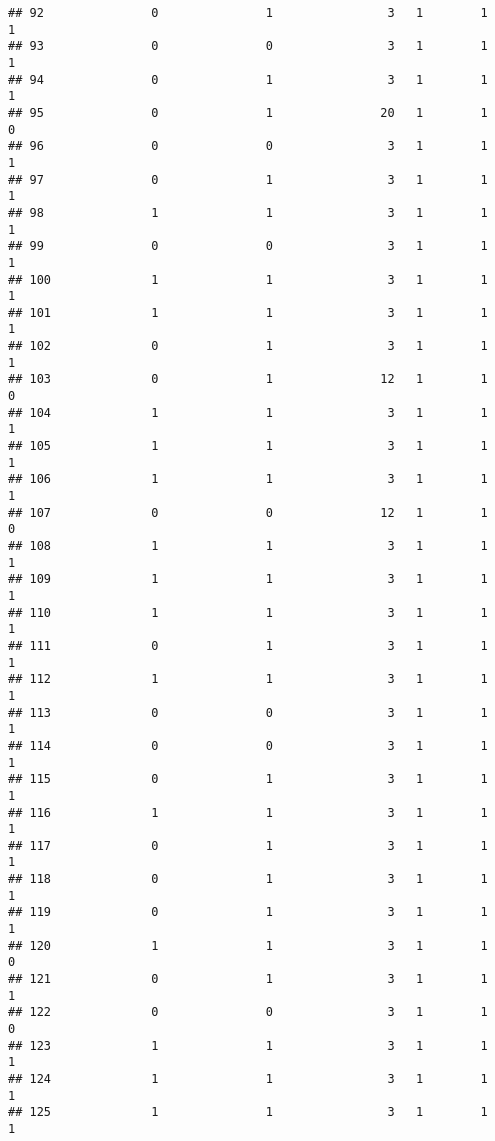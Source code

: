 \documentclass[]{article}
\begin{document}
\begin{verbatim}
## 92               0               1                3   1        1        1
## 93               0               0                3   1        1        1
## 94               0               1                3   1        1        1
## 95               0               1               20   1        1        0
## 96               0               0                3   1        1        1
## 97               0               1                3   1        1        1
## 98               1               1                3   1        1        1
## 99               0               0                3   1        1        1
## 100              1               1                3   1        1        1
## 101              1               1                3   1        1        1
## 102              0               1                3   1        1        1
## 103              0               1               12   1        1        0
## 104              1               1                3   1        1        1
## 105              1               1                3   1        1        1
## 106              1               1                3   1        1        1
## 107              0               0               12   1        1        0
## 108              1               1                3   1        1        1
## 109              1               1                3   1        1        1
## 110              1               1                3   1        1        1
## 111              0               1                3   1        1        1
## 112              1               1                3   1        1        1
## 113              0               0                3   1        1        1
## 114              0               0                3   1        1        1
## 115              0               1                3   1        1        1
## 116              1               1                3   1        1        1
## 117              0               1                3   1        1        1
## 118              0               1                3   1        1        1
## 119              0               1                3   1        1        1
## 120              1               1                3   1        1        0
## 121              0               1                3   1        1        1
## 122              0               0                3   1        1        0
## 123              1               1                3   1        1        1
## 124              1               1                3   1        1        1
## 125              1               1                3   1        1        1

\end{verbatim}
\end{document}
